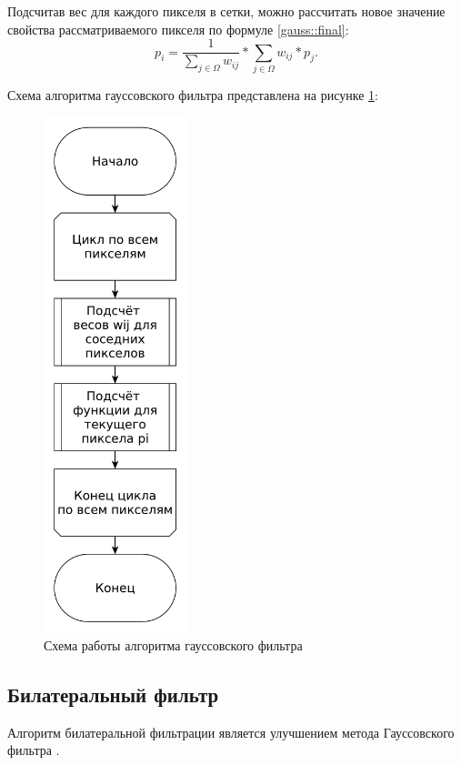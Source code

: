 Подсчитав вес для каждого пикселя в сетки, можно рассчитать новое значение свойства рассматриваемого пикселя по формуле \ref{gauss::final}:
\begin{equation}
	\label{gauss::final}
	p_i = \frac{1}{\sum_{j \in \Omega}^{} w_{ij}} * \sum_{j \in \Omega}^{} w_{ij} * p_j.
\end{equation}

Схема алгоритма гауссовского фильтра представлена на рисунке \ref{fig::gauss}:
\FloatBarrier
\begin{figure}[h]	
	\begin{center}
		\includegraphics[height=15cm]{inc/pdf/gauss.pdf}
	\end{center}
	\captionsetup{justification=centering}
	\caption{Схема работы алгоритма гауссовского фильтра}
	\label{fig::gauss}
\end{figure}
\FloatBarrier

\subsection{Билатеральный фильтр}
Алгоритм билатеральной фильтрации является улучшением метода Гауссовского фильтра \cite{bilateral}.

